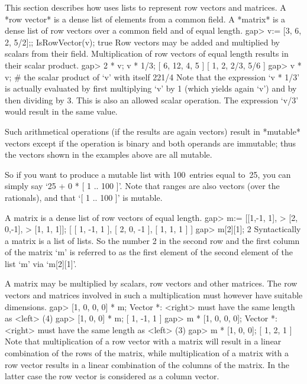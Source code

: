 This section describes how {\GAP} uses lists to represent row vectors and
matrices. A *row vector* is a dense list of elements from a common field.
A *matrix* is a dense list of row vectors over a common field and of
equal length.
\beginexample
gap> v:= [3, 6, 2, 5/2];;  IsRowVector(v);
true
\endexample
Row vectors  may be  added and multiplied   by scalars from  their field.
Multiplication of   row vectors of  equal length  results in their scalar
product.
\beginexample
gap> 2 * v;  v * 1/3;
[ 6, 12, 4, 5 ]
[ 1, 2, 2/3, 5/6 ]
gap> v * v;   # the scalar product of `v' with itself
221/4
\endexample
Note  that   the expression `v   *  1/3' is   actually evaluated by first
multiplying `v' by 1 (which yields again `v')  and by then dividing by 3.
This  is  also an allowed scalar   operation.  The expression `v/3' would
result in  the same value.

Such arithmetical operations (if the results are again vectors)
result in *mutable* vectors except if the operation is binary
and both operands are immutable;
thus the vectors shown in the examples above are all mutable.

So if you want to produce a mutable list with 100~entries equal to~25,
you can simply say `25  + 0 * [ 1 .. 100 ]'.
Note that ranges are also vectors (over the rationals),
and that `[ 1 .. 100 ]' is mutable.


%

A matrix is a dense list of row vectors of equal length.
\beginexample
gap> m:= [[1,-1, 1],
>         [2, 0,-1],
>         [1, 1, 1]];
[ [ 1, -1, 1 ], [ 2, 0, -1 ], [ 1, 1, 1 ] ]
gap> m[2][1];
2
\endexample
Syntactically a matrix is a list of lists. So the number  2 in the second
row  and the first  column of the matrix `m'  is referred to as the first
element of the second element of the list `m' via `m[2][1]'.

A matrix may be multiplied by scalars, row vectors and other matrices.
The row vectors and matrices involved in such a multiplication must
however have suitable dimensions.
\begintt
gap> [1, 0, 0, 0] * m;
Vector *: <right> must have the same length as <left> (4)
gap> [1, 0, 0] * m;
[ 1, -1, 1 ]
gap> m * [1, 0, 0, 0];
Vector *: <right> must have the same length as <left> (3)
\endtt
\beginexample
gap> m * [1, 0, 0];
[ 1, 2, 1 ]
\endexample
Note that multiplication  of a row vector with  a matrix will result in a
linear combination of the  rows of the  matrix, while multiplication of a
matrix with a row  vector results in  a linear combination of the columns
of the  matrix. In  the latter case  the  row vector is considered   as a
column vector.

